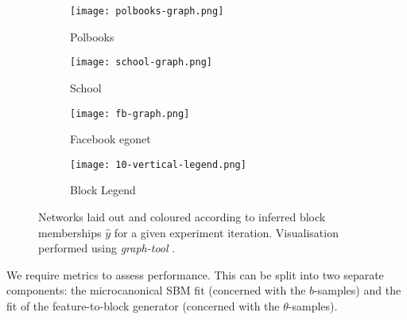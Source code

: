\begin{figure}[!h]
	\centering
	\begin{subfigure}[t]{0.28\linewidth}
		\centering
		\texttt{[image: polbooks-graph.png]}
		\caption{Polbooks}
		\label{fig:polbooks-graph}
	\end{subfigure}
	\hfill
	\begin{subfigure}[t]{0.28\linewidth}
		\centering
		\texttt{[image: school-graph.png]}
		\caption{School}
		\label{fig:school-graph}
	\end{subfigure}
	\hfill
	\begin{subfigure}[t]{0.28\linewidth}
		\centering
		\texttt{[image: fb-graph.png]}
		\caption{Facebook egonet}
		\label{fig:fb-graph}
	\end{subfigure}
	\begin{subfigure}[t]{0.11\linewidth}
		\centering
		\texttt{[image: 10-vertical-legend.png]}
		\caption{Block Legend}
		\label{fig:10-legend}
	\end{subfigure}
	\caption{Networks laid out and coloured according to inferred block memberships $\hat{y}$ for a given experiment iteration. Visualisation performed using \textit{graph-tool} \cite{peixoto_graph-tool_2014}.}
	\label{fig:graphs-all}
\end{figure}
\begin{table}[!h]
	\centering
	\caption{Experimental results averaged over $n=10$ iterations (mean $\pm$ std. dev.).}
	\label{tab:results}
\end{table}
%
We require metrics to assess performance. This can be split into two separate 
components: the microcanonical SBM fit (concerned with the $b$-samples) and 
the fit of the feature-to-block generator (concerned with the $\theta$-samples). 

